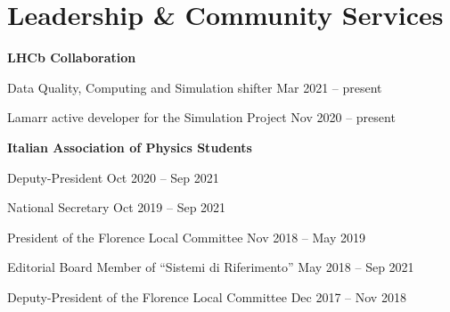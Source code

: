 \newcommand{\community}[1]
  {\normalsize \color{hlcolor-0} \textbf{#1}}

\newcommand{\button}[2]
  {\normalsize \color{maincolor} \href{#1}{#2}}
  
\newcommand{\comservice}[2]
  {{\normalsize \color{maincolor} #1} \hfill {\small \color{hlcolor-1} #2}}
  

\section*{Leadership \& Community Services}
\begin{cvcontent}
  \community{LHCb Collaboration}
  \button{http://lhcb.web.cern.ch/}{\faGlobe}\\ [1mm]
  \begin{itemize*}[label=\textcolor{iconcolor}{\textbullet}]
    \item \comservice{Data Quality, Computing and Simulation shifter}
      {Mar 2021 -- present}\\ [0.5mm]
    \item \comservice{Lamarr active developer for the Simulation Project}
      {Nov 2020 -- present}
  \end{itemize*}
  \newpage\noindent
  \community{Italian Association of Physics Students}
  \button{https://ai-sf.it/}{\faGlobe}\\ [1mm]
  \begin{itemize*}[label=\textcolor{iconcolor}{\textbullet}]
    \item \comservice{Deputy-President}
      {Oct 2020 -- Sep 2021}\\ [0.5mm]
    \item \comservice{National Secretary}
      {Oct 2019 -- Sep 2021}\\ [0.5mm]
    \item \comservice{President of the Florence Local Committee}
      {Nov 2018 -- May 2019}\\ [0.5mm]
    \item \comservice{Editorial Board Member of ``Sistemi di Riferimento''}
      {May 2018 -- Sep 2021}\\ [0.5mm]
    \item \comservice{Deputy-President of the Florence Local Committee}
      {Dec 2017 -- Nov 2018}
  \end{itemize*}
\end{cvcontent}